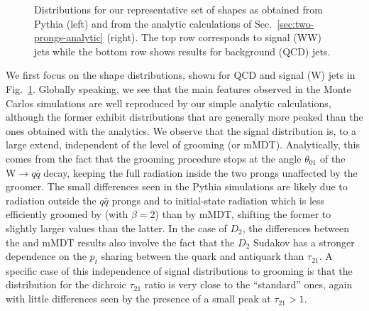 \begin{figure}
  \caption{Distributions for our representative set of shapes as
    obtained from Pythia (left) and from the analytic calculations of
    Sec.~\ref{sec:two-prongs-analytic} (right). The top row
    corresponds to signal (WW) jets while the bottom row shows results for
    background (QCD) jets.}\label{fig:shape-distribs}
\end{figure}


We first focus on the shape distributions, shown for QCD and signal (W) jets in
Fig.~\ref{fig:shape-distribs}.
%
Globally speaking, we see that the main features observed in the Monte
Carlos simulations are well reproduced by our simple analytic
calculations, although the former exhibit distributions that are generally more peaked than the ones obtained with the analytics. 
%
We observe that the signal distribution is, to a large
extend, independent of the level of grooming (\SD or
mMDT). Analytically, this comes from the fact that the grooming
procedure stops at the angle $\theta_{01}$ of the $\text{W}\to q\bar q$
decay, keeping the full radiation inside the two prongs unaffected by
the groomer.
%
The small differences seen in the Pythia simulations are likely due to
radiation outside the $q\bar q$ prongs and to initial-state radiation
which is less efficiently groomed by \SD (with $\beta=2$) than by
mMDT, shifting the former to slightly larger values than the latter.
%
In the case of $D_2$, the differences between the \SD and mMDT results
also involve the fact that the $D_2$ Sudakov has a stronger dependence
on the $p_t$ sharing between the quark and antiquark than $\tau_{21}$.
%
A specific case of this independence of signal distributions to grooming
is that the distribution for the dichroic $\tau_{21}$ ratio is very
close to the ``standard'' ones, again with little differences seen \eg
by the presence of a small peak at $\tau_{21}>1$.


